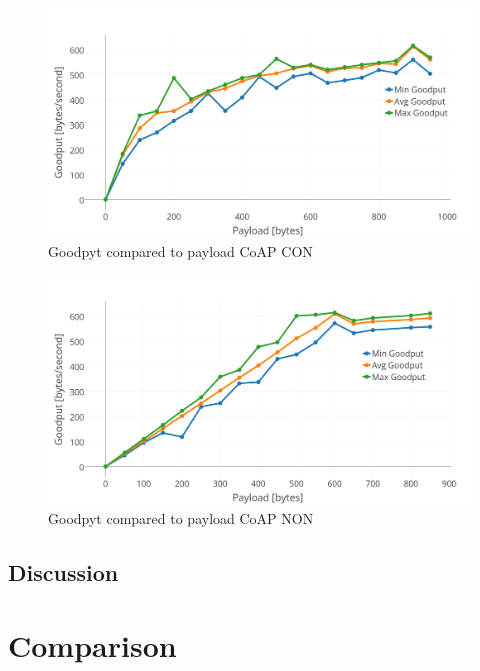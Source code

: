 \begin{figure}[ht]
    \centering
    \includegraphics[width=1.0\textwidth]{goodput_payload_CON.png}    
    \caption{Goodpyt compared to payload CoAP CON}
    \label{fig:goodPayload_CON}
\end{figure}

\begin{figure}[ht]
    \centering
    \includegraphics[width=1.0\textwidth]{goodput_payload_NON.png}    
    \caption{Goodpyt compared to payload CoAP NON}
    \label{fig:goodPayload_NON}
\end{figure}

\subsection{Discussion}

\section{Comparison}



